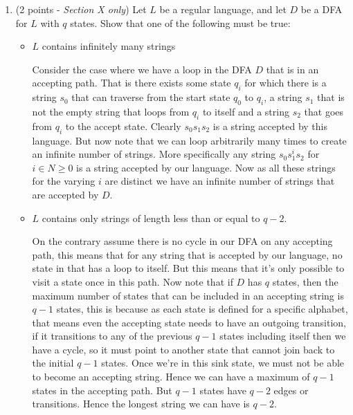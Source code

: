 \documentclass[11pt]{article}
\begin{document}
\begin{enumerate}
\begin{enumerate}
    \item (2 points - \textit{Section X only}) Let $L$ be a regular language, and let $D$ be a DFA for $L$ with $q$ states. Show that one of the following must be true:
    \begin{itemize}
    \item $L$ contains infinitely many strings
    
    \begin{answer}

      Consider the case where we have a loop in the DFA $D$ that is in an accepting path. That is there exists some state $q_i$ for which there is a string $s_{0}$ that can traverse from the start state $q_0$ to $q_i$, a string $s_{1}$ that is not the empty string that loops from $q_i$ to itself and a string $s_{2}$ that goes from $q_i$ to the accept state. Clearly $s_{0}s_{1}s_{2}$ is a string accepted by this language. But now note that we can loop arbitrarily many times to create an infinite number of strings. More specifically any string $s_{0}s_{1}^{i}s_{2}$ for $i \in N \ge 0$ is a string accepted by our language. Now as all these strings for the varying $i$ are distinct we have an infinite number of strings that are accepted by  $D$. 

    \end{answer}
    
    \item $L$ contains only strings of length less than or equal to $q-2$.
    
    \begin{answer}
      On the contrary assume there is no cycle in our DFA on any accepting path, this means that for any string that is accepted by our language, no state in that has a loop to itself. But this means that it's only possible to visit a state once in this path. Now note that if $D$ has $q$ states, then the maximum number of states that can be included in an accepting string is $q - 1$ states, this is because as each state is defined for a specific alphabet, that means even the accepting state needs to have an outgoing transition, if it transitions to any of the previous $q - 1$ states including itself then we have a cycle, so it must point to another state that cannot join back to the initial $q - 1$ states. Once we're in this sink state, we must not be able to become an accepting string. Hence we can have a maximum of $q - 1$ states in the accepting path. But $q - 1$ states have $q - 2$ edges or transitions. Hence the longest string we can have is $q - 2$.
    \end{answer}
    

\end{itemize}
\end{enumerate}
\end{enumerate}
\end{document}
